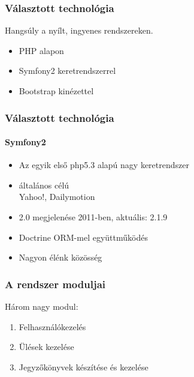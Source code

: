 \documentclass[12pt]{beamer}
\begin{document}
\begin{frame}
    \frametitle{Választott technológia}

    \Large
    Hangsúly a nyílt, ingyenes rendszereken.
    
    \begin{itemize}
        \item PHP alapon
        \item Symfony2 keretrendszerrel
        \item Bootstrap kinézettel
    \end{itemize}
\end{frame}

\begin{frame}
    \frametitle{Választott technológia}
    \framesubtitle{Symfony2}
    
    \large
    \begin{itemize}
        \item Az egyik első php5.3 alapú nagy keretrendszer
        \item általános célú\\
            \small{Yahoo!, Dailymotion}
        \large            
        \item 2.0 megjelenése 2011-ben, aktuális: 2.1.9
        \item Doctrine ORM-mel együttműködés
        \item Nagyon élénk közösség
    \end{itemize}
\end{frame}

\begin{frame}
    \frametitle{A rendszer moduljai}
    \Large
    
    Három nagy modul:
    
    \begin{enumerate}
        \item Felhasználókezelés
        \item Ülések kezelése
        \item Jegyzőkönyvek készítése és kezelése
    \end{enumerate}
\end{frame}
\end{document}
